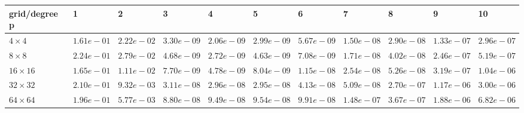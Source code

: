 \begin{tabular}{lllllllllll}
\hline
 grid/degree p   & 1          & 2          & 3          & 4          & 5          & 6          & 7          & 8          & 9          & 10         \\
\hline
 $4 \times 4$    & $1.61e-01$ & $2.22e-02$ & $3.30e-09$ & $2.06e-09$ & $2.99e-09$ & $5.67e-09$ & $1.50e-08$ & $2.90e-08$ & $1.33e-07$ & $2.96e-07$ \\
 $8 \times 8$    & $2.24e-01$ & $2.79e-02$ & $4.68e-09$ & $2.72e-09$ & $4.63e-09$ & $7.08e-09$ & $1.71e-08$ & $4.02e-08$ & $2.46e-07$ & $5.19e-07$ \\
 $16 \times 16$  & $1.65e-01$ & $1.11e-02$ & $7.70e-09$ & $4.78e-09$ & $8.04e-09$ & $1.15e-08$ & $2.54e-08$ & $5.26e-08$ & $3.19e-07$ & $1.04e-06$ \\
 $32 \times 32$  & $2.10e-01$ & $9.32e-03$ & $3.11e-08$ & $2.96e-08$ & $2.95e-08$ & $4.13e-08$ & $5.09e-08$ & $2.70e-07$ & $1.17e-06$ & $3.00e-06$ \\
 $64 \times 64$  & $1.96e-01$ & $5.77e-03$ & $8.80e-08$ & $9.49e-08$ & $9.54e-08$ & $9.91e-08$ & $1.48e-07$ & $3.67e-07$ & $1.88e-06$ & $6.82e-06$ \\
\hline
\end{tabular}